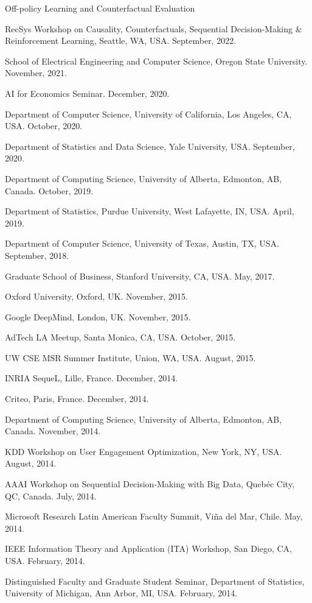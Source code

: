 \documentclass[10pt,twoside,letterpaper]{article}
\begin{document}
\begin{compactitem}
\item{Off-policy Learning and Counterfactual Evaluation}
\begin{compactitem}
\item{RecSys Workshop on Causality, Counterfactuals, Sequential Decision-Making \& Reinforcement Learning, Seattle, WA, USA. September, 2022.}
\item{School of Electrical Engineering and Computer Science, Oregon State University.  November, 2021.}
\item{AI for Economics Seminar.  December, 2020.}
\item{Department of Computer Science, University of California, Los Angeles, CA, USA.  October, 2020.}
\item{Department of Statistics and Data Science, Yale University, USA.  September, 2020.}
\item{Department of Computing Science, University of Alberta, Edmonton, AB, Canada.  October, 2019.}
\item{Department of Statistics, Purdue University, West Lafayette, IN, USA.  April, 2019.}
\item{Department of Computer Science, University of Texas, Austin, TX, USA.  September, 2018.}
\item{Graduate School of Business, Stanford University, CA, USA.  May, 2017.}
\item{Oxford University, Oxford, UK. November, 2015.}
\item{Google DeepMind, London, UK. November, 2015.}
\item{AdTech LA Meetup, Santa Monica, CA, USA. October, 2015.}
\item{UW CSE MSR Summer Institute, Union, WA, USA. August, 2015.}
\item{INRIA SequeL, Lille, France. December, 2014.}
\item{Criteo, Paris, France. December, 2014.}
\item{Department of Computing Science, University of Alberta, Edmonton, AB, Canada.  November, 2014.}
\item{KDD Workshop on User Engagement Optimization, New York, NY, USA.  August, 2014.}
\item{AAAI Workshop on Sequential Decision-Making with Big Data, Queb{\'e}c City, QC, Canada. July, 2014.}
\item{Microsoft Research Latin American Faculty Summit, Vi\~na del Mar, Chile. May, 2014.}
\item{IEEE Information Theory and Application (ITA) Workshop, San Diego, CA, USA.  February, 2014.}
\item{Distinguished Faculty and Graduate Student Seminar, Department of Statistics, University of Michigan, Ann Arbor, MI, USA.  February, 2014.}
\end{compactitem}


\end{compactitem}
\end{document}
